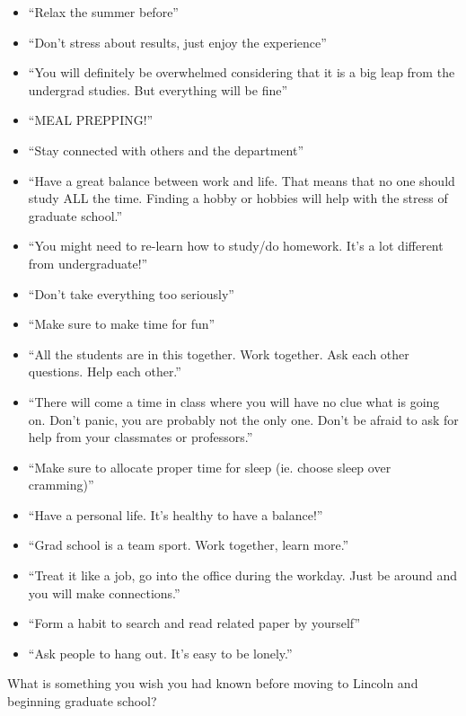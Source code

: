 \documentclass[
  12pt,
]{book}
\providecommand{\tightlist}{%
  \setlength{\itemsep}{0pt}\setlength{\parskip}{0pt}}
\begin{document}
\begin{itemize}
\tightlist
\item
  ``Relax the summer before''
\item
  ``Don't stress about results, just enjoy the experience''
\item
  ``You will definitely be overwhelmed considering that it is a big leap from the undergrad studies. But everything will be fine''
\item
  ``MEAL PREPPING!''
\item
  ``Stay connected with others and the department''
\item
  ``Have a great balance between work and life. That means that no one should study ALL the time. Finding a hobby or hobbies will help with the stress of graduate school.''
\item
  ``You might need to re-learn how to study/do homework. It's a lot different from undergraduate!''
\item
  ``Don't take everything too seriously''
\item
  ``Make sure to make time for fun''
\item
  ``All the students are in this together. Work together. Ask each other questions. Help each other.''
\item
  ``There will come a time in class where you will have no clue what is going on. Don't panic, you are probably not the only one. Don't be afraid to ask for help from your classmates or professors.''
\item
  ``Make sure to allocate proper time for sleep (ie. choose sleep over cramming)''
\item
  ``Have a personal life. It's healthy to have a balance!''
\item
  ``Grad school is a team sport. Work together, learn more.''
\item
  ``Treat it like a job, go into the office during the workday. Just be around and you will make connections.''
\item
  ``Form a habit to search and read related paper by yourself''
\item
  ``Ask people to hang out. It's easy to be lonely.''
\end{itemize}

What is something you wish you had known before moving to Lincoln and beginning graduate school?
\end{document}
